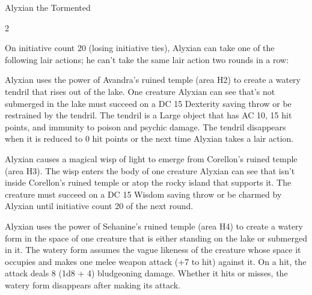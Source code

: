 \documentclass[10pt,a4paper,twoside,bg=none,twocolumn,openany,nodeprecatedcode]{dndbook}
\begin{document}
\begin{DndMonster}[float*=b,width=\textwidth + 8pt]{Alyxian the Tormented}
\begin{multicols}{2}
\begin{DndMonsterLegendaryActions}
\end{DndMonsterLegendaryActions}
\par {}
On initiative count 20 (losing initiative ties), Alyxian can take one of the following lair actions; he can't take the same lair action two rounds in a row:


\begin{description}[nolistsep]
\item[Avandra's Grasp]
Alyxian uses the power of Avandra's ruined temple (area H2) to create a watery tendril that rises out of the lake. One creature Alyxian can see that's not submerged in the lake must succeed on a DC 15 Dexterity saving throw or be restrained by the tendril. The tendril is a Large object that has AC 10, 15 hit points, and immunity to poison and psychic damage. The tendril disappears when it is reduced to 0 hit points or the next time Alyxian takes a lair action.

\item[Corellon's Charm]
Alyxian causes a magical wisp of light to emerge from Corellon's ruined temple (area H3). The wisp enters the body of one creature Alyxian can see that isn't inside Corellon's ruined temple or atop the rocky island that supports it. The creature must succeed on a DC 15 Wisdom saving throw or be charmed by Alyxian until initiative count 20 of the next round.

\item[Sehanine's Torment]
Alyxian uses the power of Sehanine's ruined temple (area H4) to create a watery form in the space of one creature that is either standing on the lake or submerged in it. The watery form assumes the vague likeness of the creature whose space it occupies and makes one melee weapon attack (+7 to hit) against it. On a hit, the attack deals 8 (1d8 + 4) bludgeoning damage. Whether it hits or misses, the watery form disappears after making its attack.


\end{description}
\end{multicols}
\end{DndMonster}
\end{document}
